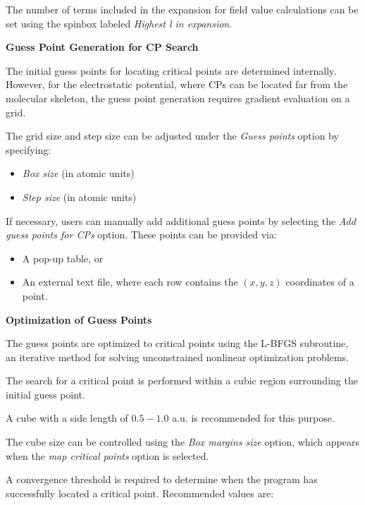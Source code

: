 \documentclass[10pt]{article}
\begin{document}
The number of terms included in the expansion for field value calculations
can be set using the spinbox labeled {\it Highest l in expansion}.

\vspace*{3mm}
{\bf Guess Point Generation for CP Search}
\vspace*{3mm}

The initial guess points for locating critical points
are determined internally. However, for the electrostatic potential,
where CPs can be located far from the molecular skeleton,
the guess point generation requires gradient evaluation on a grid.

The grid size and step size can be adjusted
under the {\it Guess points} option by specifying:

\begin{itemize}
\item {\it Box size} (in atomic units)
\item {\it Step size} (in atomic units)
\end{itemize}

If necessary, users can manually add additional guess points
by selecting the {\it Add guess points for CPs} option.
These points can be provided via:

\begin{itemize}
\item A pop-up table, or
\item An external text file, where each row contains the $(x,y,z)$ coordinates of a point.
\end{itemize}

\vspace*{3mm}
{\bf Optimization of Guess Points}
\vspace*{3mm}

The guess points are optimized to critical points using
the L-BFGS subroutine, an iterative method for solving unconstrained nonlinear optimization problems.

The search for a critical point is performed within
a cubic region surrounding the initial guess point.

A cube with a side length of $0.5-1.0$ a.u.
is recommended for this purpose.

The cube size can be controlled using the
{\it Box margins size} option, which appears
when the {\it map critical points} option is selected.

A convergence threshold is required to determine
when the program has successfully located a critical point.
Recommended values are:
\end{document}

